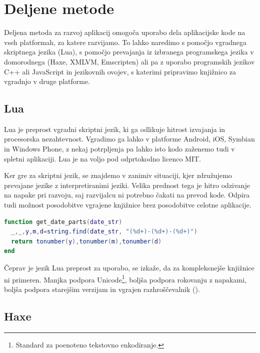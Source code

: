 \section{Deljene metode}

Deljena metoda za razvoj aplikacij omogoča uporabo dela aplikacijske kode na vseh platformah, za katere razvijamo. To lahko naredimo s pomočjo vgradnega skriptnega jezika (Lua), s pomočjo prevajanja iz izbranega programskega jezika v domorodnega (Haxe, XMLVM, Emscripten) ali pa z uporabo programskih jezikov C++ ali JavaScript in jezikovnih ovojev, s katerimi pripravimo knjižnico za vgradnjo v druge platforme.

\subsection{Lua}

Lua\cite{lua} je preprost vgradni skriptni jezik, ki ga odlikuje hitrost izvajanja in procesorska nezahtevnost. Vgradimo ga lahko v platforme Android, iOS, Symbian in Windows Phone, z nekaj potrpljenja pa lahko isto kodo zaženemo tudi v spletni aplikaciji. Lua je na voljo pod odprtokodno licenco MIT\cite{mit}.

Ker gre za skriptni jezik, se znajdemo v zanimiv situaciji, kjer združujemo prevajane jezike z interpretiranimi jeziki. Velika prednost tega je hitro odzivanje na napake pri razvoju, saj razvijalcu ni potrebno čakati na prevod kode. Odpira tudi možnost posodobitve vgrajene knjižnice brez posodobitve celotne aplikacije.

\begin{lstlisting}[caption={Primer metode v skriptnem jeziku Lua, ki datum iz oblike 2014-07-14 razbije na leto, mesec in dan.}, label=code:lua, language=LUA]
function get_date_parts(date_str)
  _,_,y,m,d=string.find(date_str, "(%d+)-(%d+)-(%d+)")
  return tonumber(y),tonumber(m),tonumber(d)
end
\end{lstlisting}

Čeprav je jezik Lua preprost za uporabo, se izkaže, da za kompleksnejše knjižnice ni primeren. Manjka podpora Unicode\footnote{Standard za poenoteno tekstovno enkodiranje.}, boljša podpora rokovanju z napakami, boljša podpora starejšim verzijam in vgrajen razhroščevalnik ().

\subsection{Haxe}

